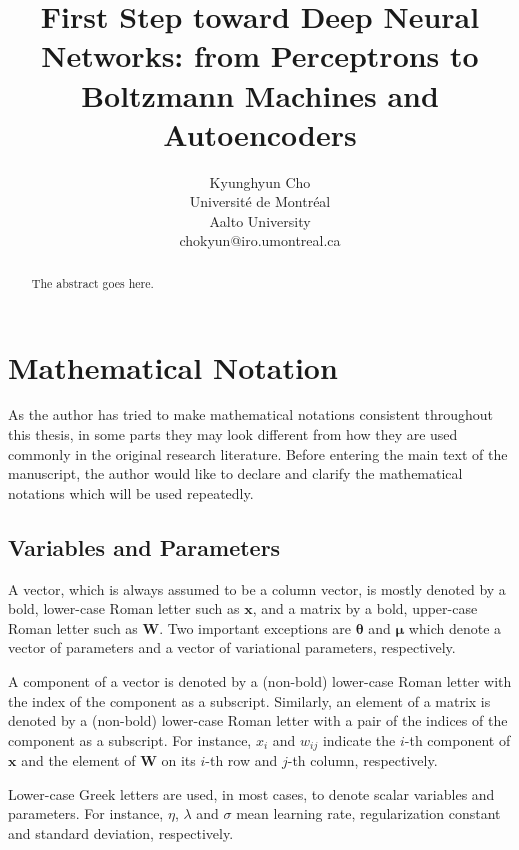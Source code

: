 \documentclass{now}
\title{First Step toward Deep Neural Networks: from Perceptrons to Boltzmann
Machines and Autoencoders}
\author{
    Kyunghyun Cho \\
    Universit\'e de Montr\'eal \\
    Aalto University \\
    chokyun@iro.umontreal.ca \\
}
\newcommand{\vect}[1]{\mathbf{#1}}
\newcommand{\vects}[1]{\boldsymbol{#1}}
\newcommand{\matr}[1]{\mathbf{#1}}
\newcommand{\vx}[0]{\vect{x}}
\newcommand{\mW}[0]{\matr{W}}
\newcommand{\vmu}[0]{\vects{\mu}}
\newcommand{\TT}[0]{{\vects{\theta}}}
\begin{document}

\frontmatter

\maketitle

\tableofcontents

\mainmatter

\begin{abstract}
The abstract goes here.
\end{abstract}

\renewcommand{\nomname}{List of Abbreviations}
%
\setlength{\nomitemsep}{-\parsep}
\printnomenclature[5em]


\chapter*{Mathematical Notation}
%

As the author has tried to make mathematical notations consistent throughout
this thesis, in some parts they may look different from how they are used
commonly in the original research literature. Before entering the main text of
the manuscript, the author would like to declare and clarify the mathematical
notations which will be used repeatedly.

\section*{Variables and Parameters}

A vector, which is always assumed to be a column vector, is mostly denoted by a
bold, lower-case Roman letter such as $\vx$, and a matrix by a bold, upper-case
Roman letter such as $\mW$. Two important exceptions are $\TT$ and $\vmu$ which
denote a vector of parameters and a vector of variational parameters,
respectively.

A component of a vector is denoted by a (non-bold) lower-case Roman letter with
the index of the component as a subscript.  Similarly, an element of a matrix
is denoted by a (non-bold) lower-case Roman letter with a pair of the indices
of the component as a subscript. For instance, $x_i$ and $w_{ij}$ indicate the
$i$-th component of $\vx$ and the element of $\mW$ on its $i$-th row and $j$-th
column, respectively.

Lower-case Greek letters are used, in most cases, to denote scalar variables
and parameters. For instance, $\eta$, $\lambda$ and $\sigma$ mean learning
rate, regularization constant and standard deviation, respectively. 
\end{document}
